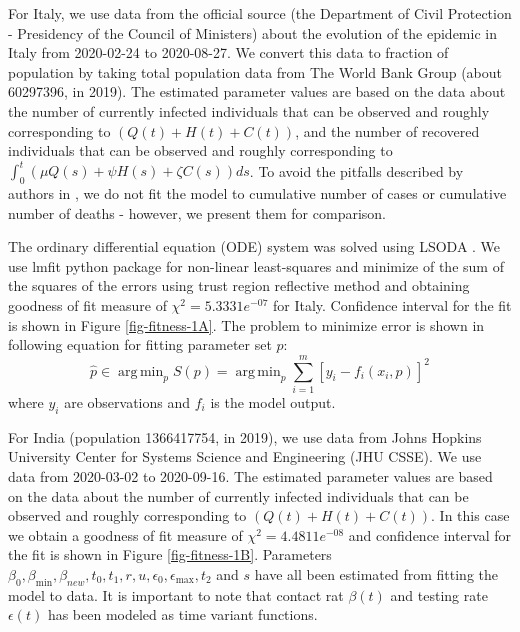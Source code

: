 \documentclass[fleqn,10pt]{wlscirep}
\DeclareMathOperator*{\argmin}{arg\,min}
\begin{document}
For Italy, we use data from the official source (the Department of Civil Protection - Presidency of the Council of Ministers) about the evolution of the epidemic in Italy from 2020-02-24 to 2020-08-27. We convert this data to fraction of population by taking total population data from The World Bank Group (about 60297396, in 2019). The estimated parameter values are based on the data about the number of currently infected individuals that can be observed and roughly corresponding to $\left( Q(t) + H(t) + C(t)\right) $, and the number of recovered individuals that can be observed and roughly corresponding to $\int_{0}^{t}{\left( \mu Q(s) + \psi H(s) + \zeta  C(s) \right) ds}$. To avoid the pitfalls described by authors in \cite{doi:10.1098/rspb.2015.0347}, we do not fit the model to cumulative number of cases or cumulative number of deaths - however, we present them for comparison.

The ordinary differential equation (ODE) system was solved using LSODA \cite{doi:10.1137/0904010, HindmarshSep2005}. We use lmfit python package \cite{LMFIT} for non-linear least-squares and minimize of the sum of the squares of the errors using trust region reflective method and obtaining goodness of fit measure of $\chi^2= 5.3331e^{-07}$ for Italy. Confidence interval for the fit is shown in Figure \ref{fig-fitness-1A}. The problem to minimize error is shown in following equation for fitting parameter set $p$:
%
\begin{equation}
\hat{p} \in \argmin_p S(p) =  \argmin_p \sum_{i=1}^{m}{\left[y_i - f_i(x_i,p)\right]^2 }
\end{equation}
%
where $y_i$ are observations and $f_i$ is the model output.

For India (population 1366417754, in 2019), we use data from Johns Hopkins University Center for Systems Science and Engineering (JHU CSSE). We use data from 2020-03-02 to 2020-09-16. The estimated parameter values are based on the data about the number of currently infected individuals that can be observed and roughly corresponding to $\left( Q(t) + H(t) + C(t)\right) $. In this case we obtain a goodness of fit measure of $\chi^2= 4.4811e^{-08}$ and confidence interval for the fit is shown in Figure \ref{fig-fitness-1B}. Parameters $\beta_0, \beta_{\min}, \beta_{new}, t_0, t_1, r, u, \epsilon_0, \epsilon_{\max}, t_2$ and $s$ have all been estimated from fitting the model to data. It is important to note that contact rat $\beta(t)$ and testing rate $\epsilon(t)$ has been modeled as time variant functions.
\end{document}
